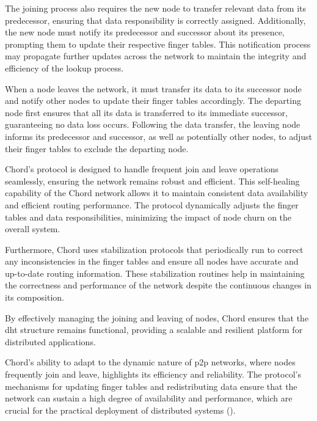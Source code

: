 The joining process also requires the new node to transfer relevant data from its predecessor, ensuring that data responsibility is correctly assigned.
Additionally, the new node must notify its predecessor and successor about its presence, prompting them to update their respective finger tables.
This notification process may propagate further updates across the network to maintain the integrity and efficiency of the lookup process.

When a node leaves the network, it must transfer its data to its successor node and notify other nodes to update their finger tables accordingly.
The departing node first ensures that all its data is transferred to its immediate successor, guaranteeing no data loss occurs.
Following the data transfer, the leaving node informs its predecessor and successor, as well as potentially other nodes, to adjust their finger tables to exclude the departing node.

Chord's protocol is designed to handle frequent join and leave operations seamlessly, ensuring the network remains robust and efficient.
This self-healing capability of the Chord network allows it to maintain consistent data availability and efficient routing performance.
The protocol dynamically adjusts the finger tables and data responsibilities, minimizing the impact of node churn on the overall system.

Furthermore, Chord uses stabilization protocols that periodically run to correct any inconsistencies in the finger tables and ensure all nodes have accurate and up-to-date routing information.
These stabilization routines help in maintaining the correctness and performance of the network despite the continuous changes in its composition.

By effectively managing the joining and leaving of nodes, Chord ensures that the \gls{dht} structure remains functional, providing a scalable and resilient platform for distributed applications.

Chord's ability to adapt to the dynamic nature of \gls{p2p} networks, where nodes frequently join and leave, highlights its efficiency and reliability.
The protocol's mechanisms for updating finger tables and redistributing data ensure that the network can sustain a high degree of availability and performance, which are crucial for the practical deployment of distributed systems (\cite{stoica2001}).

